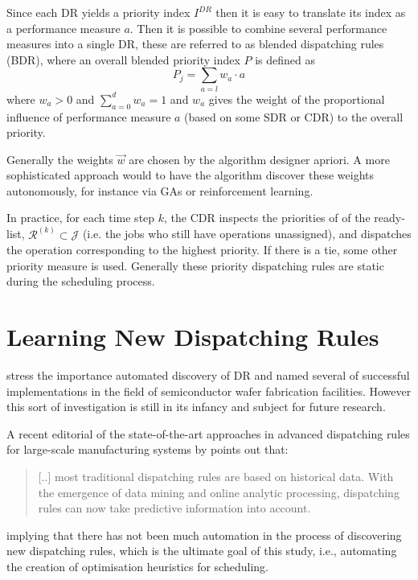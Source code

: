 \documentclass[smallextended]{svjour3}
\begin{document}
	Since each DR yields a priority index $I^{DR}$ then it is easy to translate its index as a  performance measure $a$. Then it is possible to combine several performance measures into a single DR, these are referred to as blended dispatching rules (BDR), where an overall blended priority index $P$ is defined as 
	\begin{equation}
	P_j = \sum_{a=l} w_a \cdot a 
	\end{equation}
	where $w_a>0$ and $\sum_{a=0}^d w_a = 1$ and $w_a$ gives the weight of the proportional influence of performance measure $a$ (based on some SDR or CDR) to the overall priority.
	
	Generally the weights $\vec{w}$ are chosen by the algorithm designer apriori. 
	A more sophisticated approach would to have the algorithm discover these weights autonomously, for instance via GAs or reinforcement learning. 
	
	In practice, for each time step $k$, the CDR inspects the priorities of of the ready-list, $\mathcal{R}^{(k)}\subset\mathcal{J}$ (i.e. the jobs who still have operations unassigned), and dispatches the operation corresponding to the highest priority. 
	If there is a tie, some other priority measure is used. Generally these priority dispatching rules are static during the scheduling process. 
	
	\section{Learning New Dispatching Rules}\label{ch:learningmodels}
	
	
	\cite{Monch13} stress the importance automated discovery of DR and named several of successful implementations in the field of semiconductor wafer fabrication facilities. However this sort of investigation is still in its infancy and subject for future research.
	
	A recent editorial of the state-of-the-art approaches in advanced dispatching rules for large-scale manufacturing systems by \citet{Chen13} points out that:
	\begin{quote}
		[..] most traditional dispatching rules are based on historical data. With the emergence of data mining and online analytic processing, dispatching rules can now take predictive information into account.
	\end{quote}
	implying that there has not been much automation in the process of discovering new dispatching rules, which is the ultimate goal of this study, i.e., automating the creation of optimisation heuristics for scheduling. 
	
\end{document}
